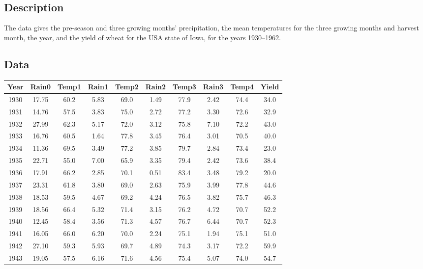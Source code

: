 \documentclass{article}
\newcommand{\strutt}{\vrule height 2.5ex depth 0.5ex width 0ex}%
\begin{document}
\subsection*{Description}
The data gives the pre-season and three growing months' precipitation, the
mean temperatures for the three growing months and harvest month, the year,
and the yield of wheat for the USA state of Iowa, for the years 1930--1962.

\subsection*{Data}

\begin{table}[ht]
\begin{center}
\small
\begin{tabular}{@{\protect\strutt}|ccccccccc|c|}
\hline
 Year & Rain0 & Temp1 & Rain1 &Temp2 & Rain2 &Temp3 & Rain3 &Temp4 &
 Yield\\
\hline
 1930 & 17.75 &  60.2 &  5.83 & 69.0 &  1.49 & 77.9 &  2.42 & 74.4 &  34.0\\
 1931 & 14.76 &  57.5 &  3.83 & 75.0 &  2.72 & 77.2 &  3.30 & 72.6 &  32.9\\
 1932 & 27.99 &  62.3 &  5.17 & 72.0 &  3.12 & 75.8 &  7.10 & 72.2 &  43.0\\
 1933 & 16.76 &  60.5 &  1.64 & 77.8 &  3.45 & 76.4 &  3.01 & 70.5 &  40.0\\
 1934 & 11.36 &  69.5 &  3.49 & 77.2 &  3.85 & 79.7 &  2.84 & 73.4 &  23.0\\
 1935 & 22.71 &  55.0 &  7.00 & 65.9 &  3.35 & 79.4 &  2.42 & 73.6 &  38.4\\
 1936 & 17.91 &  66.2 &  2.85 & 70.1 &  0.51 & 83.4 &  3.48 & 79.2 &  20.0\\
 1937 & 23.31 &  61.8 &  3.80 & 69.0 &  2.63 & 75.9 &  3.99 & 77.8 &  44.6\\
 1938 & 18.53 &  59.5 &  4.67 & 69.2 &  4.24 & 76.5 &  3.82 & 75.7 &  46.3\\
 1939 & 18.56 &  66.4 &  5.32 & 71.4 &  3.15 & 76.2 &  4.72 & 70.7 &  52.2\\
 1940 & 12.45 &  58.4 &  3.56 & 71.3 &  4.57 & 76.7 &  6.44 & 70.7 &  52.3\\
 1941 & 16.05 &  66.0 &  6.20 & 70.0 &  2.24 & 75.1 &  1.94 & 75.1 &  51.0\\
 1942 & 27.10 &  59.3 &  5.93 & 69.7 &  4.89 & 74.3 &  3.17 & 72.2 &  59.9\\
 1943 & 19.05 &  57.5 &  6.16 & 71.6 &  4.56 & 75.4 &  5.07 & 74.0 &  54.7\\

\end{tabular}
\end{center}
\end{table}
\end{document}
